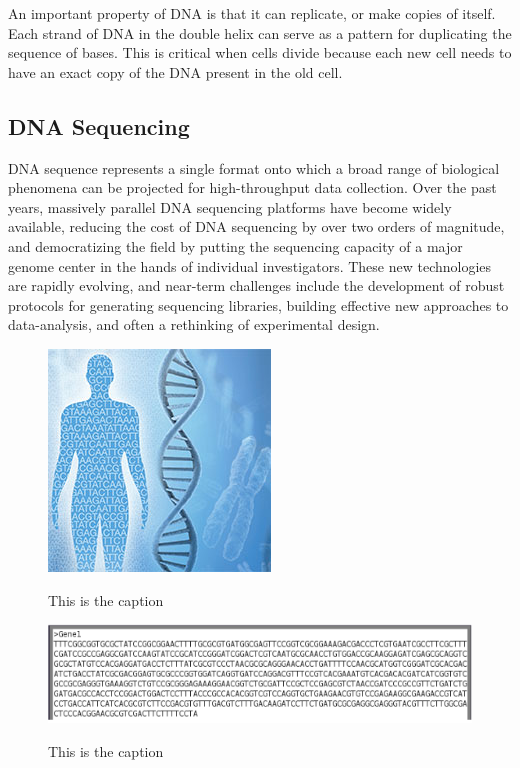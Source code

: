 \documentclass{llncs}
\begin{document}
An important property of DNA is that it can replicate, or make copies of itself. Each strand of DNA in the double helix can serve as a pattern for duplicating the sequence of bases. This is critical when cells divide because each new cell needs to have an exact copy of the DNA present in the old cell.

\subsection{DNA Sequencing}
DNA sequence represents a single format onto which a broad range of biological phenomena can be projected for high-throughput data collection. 
Over the past years, massively parallel DNA sequencing platforms have become widely available, reducing the cost of DNA sequencing by over two orders of magnitude, and democratizing the field by putting the sequencing capacity of a major genome center in the hands of individual investigators. These new technologies are rapidly evolving, and near-term challenges include the development of robust protocols for generating sequencing libraries, building effective new approaches to data-analysis, and often a rethinking of experimental design.
\begin{figure}
	\centering
	\includegraphics{./figs/NGS-1}
	\label{fig:fig2}
	\caption[caption]{This is the caption}
\end{figure}

\begin{figure}
	\centering
	\includegraphics[width=.911\linewidth]{./figs/NGS-2}
	\label{fig:fig3}
	\caption[caption]{This is the caption}
\end{figure}
\end{document}
